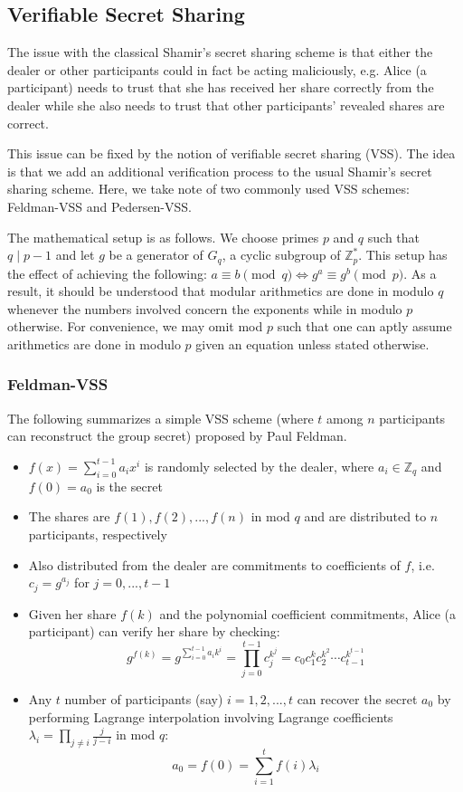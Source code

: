 \documentclass[11pt]{article}
\theoremstyle{definition}
\theoremstyle{remark}
\begin{document}
\subsection{Verifiable Secret Sharing}
The issue with the classical Shamir's secret sharing scheme is that either the dealer or other participants could in fact be acting maliciously, e.g. Alice (a participant) needs to trust that she has received her share correctly from the dealer while she also needs to trust that other participants' revealed shares are correct.

This issue can be fixed by the notion of verifiable secret sharing (VSS). The idea is that we add an additional verification process to the usual Shamir's secret sharing scheme. Here, we take note of two commonly used VSS schemes: Feldman-VSS and Pedersen-VSS.

The mathematical setup is as follows. We choose primes $p$ and $q$ such that $q \mid p - 1$ and let $g$ be a generator of $G_q$, a cyclic subgroup of $\mathbb{Z}^*_p$. This setup has the effect of achieving the following: $a \equiv b \pmod q \iff g^a \equiv g^b \pmod p$. As a result, it should be understood that modular arithmetics are done in modulo $q$ whenever the numbers involved concern the exponents while in modulo $p$ otherwise. For convenience, we may omit mod $p$ such that one can aptly assume arithmetics are done in modulo $p$ given an equation unless stated otherwise.

\subsubsection{Feldman-VSS}
The following summarizes a simple VSS scheme (where $t$ among $n$ participants can reconstruct the group secret) proposed by Paul Feldman.

\begin{itemize}
\item $f(x) = \sum_{i = 0}^{t - 1} a_i x^i$ is randomly selected by the dealer, where $a_i \in \mathbb{Z}_q$ and $f(0) = a_0$ is the secret
\item The shares are $f(1), f(2), ..., f(n)$ in mod $q$ and are distributed to $n$ participants, respectively
\item Also distributed from the dealer are commitments to coefficients of $f$, i.e. $c_j = g^{a_j}$ for $j = 0, ..., t - 1$
\item Given her share $f(k)$ and the polynomial coefficient commitments, Alice (a participant) can verify her share by checking:
$$g^{f(k)} = g^{\sum_{i = 0}^{t - 1} a_i k^i} = \prod_{j = 0}^{t - 1} c_j^{k^j} = c_0 c_1^k c_2^{k^2} \cdots c_{t - 1}^{k^{t - 1}}$$
\item Any $t$ number of participants (say) $i = 1, 2, ..., t$ can recover the secret $a_0$ by performing Lagrange interpolation involving Lagrange coefficients $\lambda_i = \prod_{j \neq i} \frac{j}{j - i}$ in mod $q$:
$$a_0 = f(0) = \sum_{i = 1}^{t} f(i) \lambda_i$$
\end{itemize}
\end{document}
